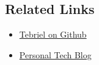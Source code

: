 \documentclass[margin]{res}
\begin{document}
\begin{resume}
\section{Related Links}
    \begin{itemize}
        \item \href{https://github.com/tebriel}{Tebriel on Github}
        \item \href{http://ghost.frodux.in/}{Personal Tech Blog}
    \end{itemize}

\end{resume}
\end{document}
